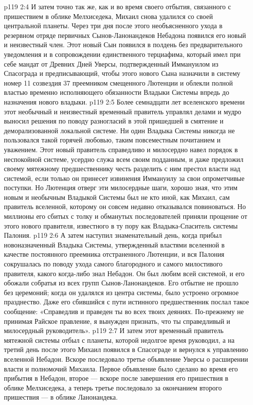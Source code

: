 \vs p119 2:4 И затем точно так же, как и во время своего отбытия, связанного с пришествием в облике Мелхиседека, Михаил снова удалился со своей центральной планеты. Через три дня после этого необъясненного ухода в резервном отряде первичных Сынов\hyp{}Ланонандеков Небадона появился его новый и неизвестный член. Этот новый Сын появился в полдень без предварительного уведомления и в сопровождении единственного терциафима, который имел при себе мандат от Древних Дней Уверсы, подтвержденный Иммануилом из Спасограда и предписывающий, чтобы этого нового Сына назначили в систему номер 11 созвездия 37 преемником смещенного Лютенции и облекли полной властью временно исполняющего обязанности Владыки Системы впредь до назначения нового владыки.
\vs p119 2:5 Более семнадцати лет вселенского времени этот необычный и неизвестный временный правитель управлял делами и мудро выносил решения по поводу разногласий в этой пришедшей в смятение и деморализованной локальной системе. Ни один Владыка Системы никогда не пользовался такой горячей любовью, таким повсеместным почитанием и уважением. Этот новый правитель справедливо и милосердно навел порядок в неспокойной системе, усердно служа всем своим подданным, и даже предложил своему мятежному предшественнику честь разделить с ним престол власти над системой, если только он принесет извинения Иммануилу за свои опрометчивые поступки. Но Лютенция отверг эти милосердные шаги, хорошо зная, что этим новым и необычным Владыкой Системы был не кто иной, как Михаил, сам правитель вселенной, которому он совсем недавно отказывался повиноваться. Но миллионы его сбитых с толку и обманутых последователей приняли прощение от этого нового правителя, известного в ту пору как Владыка\hyp{}Спаситель системы Палония.
\vs p119 2:6 \pc А затем наступил знаменательный день, когда прибыл новоназначенный Владыка Системы, утвержденный властями вселенной в качестве постоянного преемника отстраненного Лютенции, и вся Палония сокрушалась по поводу ухода самого благородного и самого милостивого правителя, какого когда\hyp{}либо знал Небадон. Он был любим всей системой, и его обожали собратья из всех групп Сынов\hyp{}Ланонандеков. Его отбытие не прошло без церемоний; когда он удалялся из центра системы, было устроено огромное празднество. Даже его сбившийся с пути истинного предшественник послал такое сообщение: «Справедлив и праведен ты во всех твоих деяниях. По\hyp{}прежнему не принимая Райское правление, я вынужден признать, что ты справедливый и милосердный руководитель».
\vs p119 2:7 И затем этот временный правитель мятежной системы отбыл с планеты, которой недолгое время руководил, а на третий день после этого Михаил появился в Спасограде и вернулся к управлению вселенной Небадон. Вскоре последовало третье объявление Уверсы о расширении власти и полномочий Михаила. Первое объявление было сделано во время его прибытия в Небадон, второе --- вскоре после завершения его пришествия в облике Мелхиседека, а теперь третье последовало за окончанием второго пришествия --- в облике Ланонандека.

